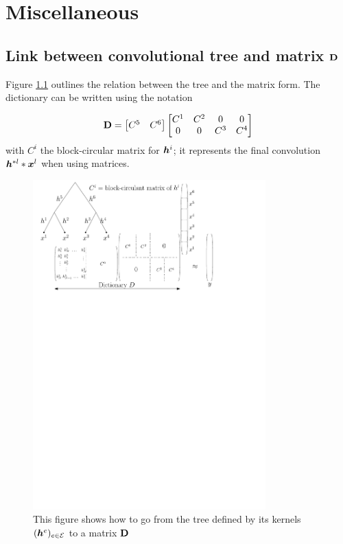 \clearpage
{}
\appendix

\chapter{Miscellaneous}
\section{Link between convolutional tree and matrix $\mathbf D$}

Figure \ref{fig_block_circular} outlines the relation between the tree and the matrix form. The dictionary can be written using the notation

$$\mathbf D = \begin{bmatrix}C^5 & C^6\end{bmatrix} \begin{bmatrix}C^1 & C^2 & 0 & 0 \\0 & 0 & C^3 & C^4\end{bmatrix}$$
with $C^i$ the block-circular matrix for $\bm{h}^i$; it represents the final convolution $\bm{h}^{*l}*\bm x^l$ when using matrices.

\begin{figure}[!ht] \centering
	\includegraphics[width=0.8\textwidth]{figures/block-circular-matrix.pdf}
	\caption{This figure shows how to go from the tree defined by its kernels $(\bm{h}^e)_{e \in \mathcal E}$ to a matrix $\mathbf D$} \label{fig_block_circular}
\end{figure}

